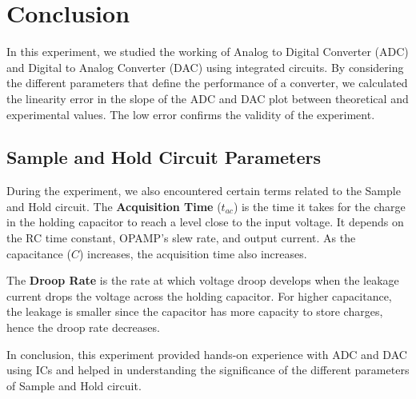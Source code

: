 \section{Conclusion}
	In this experiment, we studied the working of Analog to Digital Converter (ADC) and Digital to Analog Converter (DAC) using integrated circuits. By considering the different parameters that define the performance of a converter, we calculated the linearity error in the slope of the ADC and DAC plot between theoretical and experimental values. The low error confirms the validity of the experiment.

	\subsection{Sample and Hold Circuit Parameters}
		During the experiment, we also encountered certain terms related to the Sample and Hold circuit. The \textbf{Acquisition Time} ($t_{ac}$) is the time it takes for the charge in the holding capacitor to reach a level close to the input voltage. It depends on the RC time constant, OPAMP's slew rate, and output current. As the capacitance ($C$) increases, the acquisition time also increases.

		The \textbf{Droop Rate} is the rate at which voltage droop develops when the leakage current drops the voltage across the holding capacitor. For higher capacitance, the leakage is smaller since the capacitor has more capacity to store charges, hence the droop rate decreases.

		In conclusion, this experiment provided hands-on experience with ADC and DAC using ICs and helped in understanding the significance of the different parameters of Sample and Hold circuit.